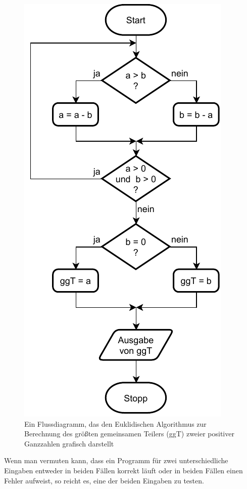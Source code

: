 \begin{figure}[h!]
	\centering
	\includegraphics[scale=0.75]{Bilder/Kapitel-1/Abb-1-4.pdf}
	\caption[Der Euklidische Algorithmus als Flussdiagramm]{Ein Flussdiagramm, das den Euklidischen Algorithmus zur Be\-rechnung des größten gemeinsamen Teilers (ggT) zweier positiver Ganzzahlen grafisch darstellt}
	\label{fig:flussdiagramm_in_Kap-11}
\end{figure}



Wenn man vermuten kann, dass ein Programm für zwei unterschiedliche Eingaben entweder in beiden Fällen korrekt läuft oder in beiden Fällen einen Fehler aufweist, so reicht es, eine der beiden Eingaben zu testen.

